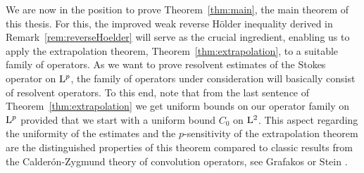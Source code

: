We are now in the position to prove Theorem~\ref{thm:main}, the main theorem of this thesis. 
For this, the improved weak reverse H\"older inequality derived in Remark~\ref{rem:reverseHoelder} will serve as the crucial ingredient, enabling us to apply the extrapolation theorem, Theorem~\ref{thm:extrapolation}, to a suitable family of operators.
As we want to prove resolvent estimates of the Stokes operator on $\mathrm{L}^p$, the family of operators under consideration will basically consist of resolvent operators.
To this end, note that from the last sentence of Theorem~\ref{thm:extrapolation} we get uniform bounds on our operator family on $\mathrm{L}^p$ provided that we start with a uniform bound $C_0$ on $\mathrm{L}^2$.
This aspect regarding the uniformity of the estimates and the $p$-sensitivity of the extrapolation theorem are the distinguished properties of this theorem compared to classic results from the Calder\'on-Zygmund theory of convolution operators, see Grafakos \cite[Sec.\@~5.3]{grafakos2014classical} or Stein \cite[Ch.\@~2]{stein}.



